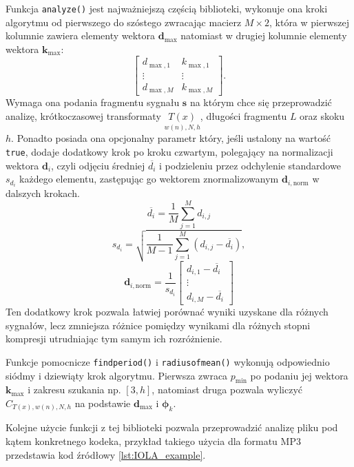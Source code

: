 \documentclass[pl,12pt]{aghdpl}
\begin{document}
Funkcja \lstinline|analyze()| jest najważniejszą częścią biblioteki, wykonuje
ona kroki algorytmu od pierwszego do szóstego zwracając macierz $M \times 2$,
która w pierwszej kolumnie zawiera elementy wektora $\bm d_{\max}$ natomiast w
drugiej kolumnie elementy wektora $\bm k_{\max}$:
\[\begin{bmatrix}
    d_{\max,1} & k_{\max,1}\\
    \vdots & \vdots\\
    d_{\max,M} & k_{\max,M}
\end{bmatrix}.\]
Wymaga ona podania fragmentu sygnału $\bm s$ na którym chce się przeprowadzić
analizę, krótkoczasowej transformaty $\underset{w(n),N,h}{T(x)}$, długości
fragmentu $L$ oraz skoku $h$. Ponadto posiada ona opcjonalny parametr który,
jeśli ustalony na wartość \lstinline|true|, dodaje dodatkowy krok po kroku
czwartym, polegający na normalizacji wektora $\bm d_i$, czyli odjęciu średniej
$\overline{d_i}$ i podzieleniu przez odchylenie standardowe $s_{d_i}$ każdego
elementu, zastępując go wektorem znormalizowanym $\bm d_{i, \text{norm}}$ w
dalszych krokach.
\begin{equation}
  \overline{d_i} = \frac{1}{M}\sum_{j=1}^{M}d_{i,j}
\end{equation}
\begin{equation}
  s_{d_i} = \sqrt{\frac{1}{M-1}\sum_{j=1}^{M}\left(d_{i, j} -
  \overline{d_{i}}\right)},
\end{equation}
\begin{equation}
  \bm d_{i, \text{norm}} = \frac{1}{s_{d_i}}\begin{bmatrix}
    d_{i,1} - \overline{d_i}\\
    \vdots\\
    d_{i,M} - \overline{d_i}
  \end{bmatrix}
\end{equation}
Ten dodatkowy krok pozwala łatwiej porównać wyniki uzyskane dla różnych
sygnałów, lecz zmniejsza różnice pomiędzy wynikami dla różnych stopni kompresji
utrudniając tym samym ich rozróżnienie.

Funkcje pomocnicze \lstinline|findperiod()| i \lstinline|radiusofmean()|
wykonują odpowiednio siódmy i dziewiąty krok algorytmu. Pierwsza zwraca
$p_{\min}$ po podaniu jej wektora $\bm k_{\max}$ i zakresu szukania np.
$[3,h]$, natomiast druga pozwala wyliczyć $C_{T(x),w(n),N,h}$ na podstawie $\bm
d_{\max}$ i $\bm\phi_k$.

Kolejne użycie funkcji z tej biblioteki pozwala przeprowadzić analizę pliku pod
kątem konkretnego kodeka, przykład takiego użycia dla formatu MP3 przedstawia
kod źródłowy \ref{lst:IOLA_example}.
\end{document}
